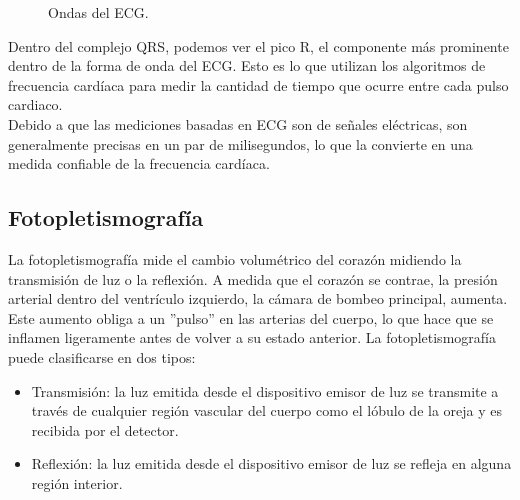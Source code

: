 		\begin{figure}[htbp!]
			\centering
			\caption{Ondas del ECG.}
			\label{fig:ECGwave}
		\end{figure}
		
		Dentro del complejo QRS, podemos ver el pico R, el componente más prominente dentro de la forma de onda del ECG. Esto es lo que utilizan los algoritmos de frecuencia cardíaca para medir la cantidad de tiempo que ocurre entre cada pulso cardiaco. \\
		
		Debido a que las mediciones basadas en ECG son de señales eléctricas, son generalmente precisas en un par de milisegundos, lo que la convierte en una medida confiable de la frecuencia cardíaca.
		
		\subsection{Fotopletismografía}
			La fotopletismografía mide el cambio volumétrico del corazón midiendo la transmisión de luz o la reflexión. A medida que el corazón se contrae, la presión arterial dentro del ventrículo izquierdo, la cámara de bombeo principal, aumenta. Este aumento obliga a un ''pulso'' en las arterias del cuerpo, lo que hace que se inflamen ligeramente antes de volver a su estado anterior. La fotopletismografía puede clasificarse en dos tipos: \\
			
			\begin{itemize}
				\item Transmisión: la luz emitida desde el dispositivo emisor de luz se transmite a través de cualquier región vascular del cuerpo como el lóbulo de la oreja y es recibida por el detector.
				\item Reflexión: la luz emitida desde el dispositivo emisor de luz se refleja en alguna región interior.
			\end{itemize}
			
